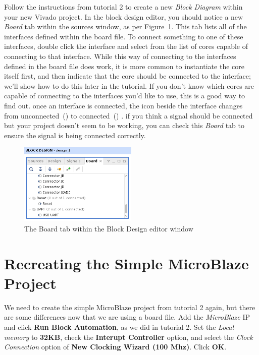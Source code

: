 \documentclass[11pt]{article}
\begin{document}
Follow the instructions from tutorial 2 to create a new \textit{Block Diagram} within your new Vivado project. In the block design editor, you should notice a new \textit{Board} tab within the sources window, as per Figure~\ref{fig:board_sources_tab}. This tab lists all of the interfaces defined within the board file. To connect something to one of these interfaces, double click the interface and select from the list of cores capable of connecting to that interface. While this way of connecting to the interfaces defined in the board file does work, it is more common to instantiate the core itself first, and then indicate that the core should be connected to the interface; we'll show how to do this later in the tutorial. If you don't know which cores are capable of connecting to the interfaces you'd like to use, this is a good way to find out. once an interface is connected, the icon beside the interface changes from unconnected~()
to connected~()
. if you think a signal should be connected but your project doesn't seem to be working, you can check this \textit{Board} tab to ensure the signal is being connected correctly.

\begin{figure}[!h]
    \centering
    \includegraphics[width=0.5\textwidth]{images/board_sources_tab.png}
    \caption{The Board tab within the Block Design editor window}
    \label{fig:board_sources_tab}
\end{figure}




\section{Recreating the Simple MicroBlaze Project}
\label{sec:adding_cores}
We need to create the simple MicroBlaze project from tutorial 2 again, but there are some differences now that we are using a board file. Add the \textit{MicroBlaze} IP and click \textbf{Run Block Automation}, as we did in tutorial 2. Set the \textit{Local memory} to \textbf{32KB}, check the \textbf{Interupt Controller} option, and select the \textit{Clock Connection} option of \textbf{New Clocking Wizard (100 Mhz)}. Click \textbf{OK}. 
\end{document}
